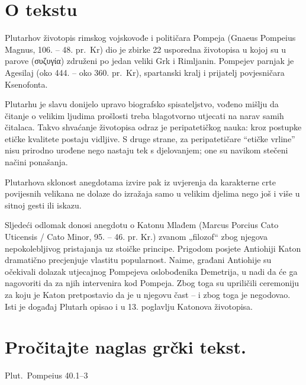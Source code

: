 

\section*{O tekstu}

Plutarhov životopis rimskog vojskovođe i političara Pompeja (Gnaeus Pompeius Magnus, 106. – 48. pr.~Kr) dio je zbirke 22 usporedna životopisa u kojoj su u parove \textgreek[variant=ancient]{(συζυγία)} združeni po jedan veliki Grk i Rimljanin. Pompejev parnjak je Agesilaj (oko 444. – oko 360. pr.~Kr), spartanski kralj i prijatelj povjesničara Ksenofonta. 

Plutarhu je slavu donijelo upravo biografsko spisateljstvo, vođeno mišlju da čitanje o velikim ljudima prošlosti treba blagotvorno utjecati na narav samih čitalaca. Takvo shvaćanje životopisa odraz je peripatetičkog nauka: kroz postupke etičke kvalitete postaju vidljive. S druge strane, za peripatetičare ``etičke vrline'' nisu prirodno urođene nego nastaju tek s djelovanjem; one su navikom stečeni načini ponašanja. 

Plutarhova sklonost anegdotama izvire pak iz uvjerenja da karakterne crte povijesnih velikana ne dolaze do izražaja samo u velikim djelima nego još i više u sitnoj gesti ili iskazu. 

Sljedeći odlomak donosi anegdotu o Katonu Mlađem (Marcus Porcius Cato Uticensis / Cato Minor, 95. – 46. pr. Kr.) zvanom „filozof“ zbog njegova nepokolebljivog pristajanja uz stoičke principe. Prigodom posjete Antiohiji Katon dramatično precjenjuje vlastitu popularnost. Naime, građani Antiohije su očekivali dolazak utjecajnog Pompejeva oslobođenika Demetrija, u nadi da će ga nagovoriti da za njih intervenira kod Pompeja. Zbog toga su upriličili ceremoniju za koju je Katon pretpostavio da je u njegovu čast – i zbog toga je negodovao. Isti je događaj Plutarh opisao i u 13. poglavlju Katonova životopisa.


\section*{Pročitajte naglas grčki tekst.}

Plut.\ Pompeius 40.1–3


\medskip


